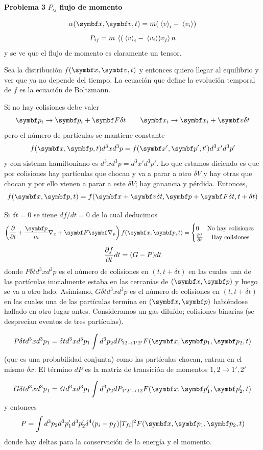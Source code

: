 \documentclass[10pt,oneside]{CBFT_book}
\begin{document}
\begin{ejemplo}{\bf Problema 3}
{\bf $P_{ij}$ flujo de momento}

\[
	\alpha(\vbx, \vb{v}, t) = m ( \vm{v}_i - \vm{v_i} )
\]
\[
	P_{ij} = m \:\left\langle   (\:\left\langle v \right\rangle_i - \:\left\langle v_i \right\rangle) v_j  \right\rangle n
\]
y se ve que el flujo de momento es claramente un tensor.

Sea la distribución $f(\vbx, \vbv, t )$ y entonces quiero llegar al equilibrio y ver que ya no
depende del tiempo. La ecuación que define la evolución temporal de $f$ es la ecuación de
Boltzmann.

Si no hay colisiones debe valer
\[
	\vbp_i \to \vbp_i + \vb{F} \delta t \qquad 
	\vbx_i \to \vbx_i + \vbv \delta t
\]
pero el número de partículas se mantiene constante
\[
	f(\vbx,\vbp, t) d^3x d^3p = f(\vbx',\vbp', t') d^3x' d^3p'
\]
y con sistema hamiltoniano es $ d^3x d^3p = d^3x' d^3p'$.
Lo que estamos diciendo es que por colisiones hay partículas que chocan y va a parar a otro $\delta V$
y hay otras que chocan y por ello vienen a parar a este $\delta V$; hay ganancia y pérdida.
Entonces,
\[
	f(\vbx,\vbp, t) = f(\vbx + \vbv \delta t,\vbp + \vb{F} \delta t, t + \delta t)
\]

Si $\delta t=0$ se tiene $df/dt=0$ de lo cual deducimos
\[
	\left( \dpar{}{t} + \frac{\vbp}{m} \nabla_x + \vb{F}\Nabla_p \right) f(\vbx,\vbp,t) = 
	\begin{cases}
	 0 \quad \text{ No hay colisiones}\\
	 \dpar{f}{t} \quad \text{ Hay colisiones}\\
	\end{cases}
\]
\[
	\frac{\partial^{\hspace{-0.05em}} {f}}{\partial {t}^{\hspace{-0.05em}}} dt = (G-P) dt
\]
donde $P \delta t d^3x d^3p$ es el número de colisiones en $(t,t+\delta t)$ en las cuales una de las
partículas inicialmente estaba en las cercanías de $(\vbx,\vbp)$ y luego se va a otro lado.
Asimismo, $G \delta t d^3x d^3p$ es el número de colisiones en $(t,t+\delta t)$ en las cuales una de las
partículas termina en $(\vbx,\vbp)$ habiéndose hallado en otro lugar antes.
Consideramos un gas diluído; colisiones binarias (se desprecian eventos de tres partículas).

\[
	P \delta t d^3x d^3p_1 = \delta t d^3x d^3p_1 \int d^3 p_2 dP_{12\to 1'2'} F(\vbx,\vbp_1,\vbp_2,t)
\]
(que es una probabilidad conjunta) como las partículas chocan, entran en el mismo $\delta x$.
El término $dP$ es la matriz de transición de momentos $1,2 \to 1',2'$

\[
	G \delta t d^3x d^3p_1 = \delta t d^3x d^3p_1 \int d^3 p_2 dP_{1'2'\to 12} F(\vbx,\vbp_1',\vbp_2',t)
\]
y entonces
\[
	P = \int d^3p_2 d^3p_1' d^3p_2' \delta^4(p_i-p_f) |T_{fi}|^2 F(\vbx,\vbp_1,\vbp_2,t)
\]
donde hay deltas para la conservación de la energía y el momento.



\end{ejemplo}
\end{document}

